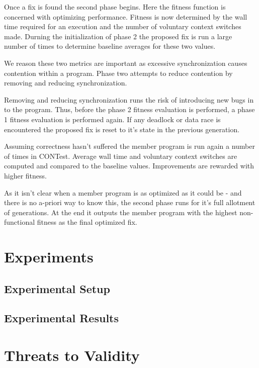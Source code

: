 \documentclass[10pt, conference, compsocconf]{IEEEtran}
\begin{document}
Once a fix is found the second phase begins.  Here the fitness function is concerned with optimizing performance.  Fitness is now determined by the wall time required for an execution and the number of voluntary context switches made.  Durning the initialization of phase 2 the proposed fix is run a large number of times to determine baseline averages for these two values.

We reason these two metrics are important as excessive synchronization causes contention within a program.  Phase two attempts to reduce contention by removing and reducing synchronization.

Removing and reducing synchronization runs the risk of introducing new bugs in to the program.  Thus, before the phase 2 fitness evaluation is performed, a phase 1 fitness evaluation is performed again.  If any deadlock or data race is encountered the proposed fix is reset to it's state in the previous generation. 

Assuming correctness hasn't suffered the member program is run again a number of times in CONTest.  Average wall time and voluntary context switches are computed and compared to the baseline values.  Improvements are rewarded with higher fitness.  

As it isn't clear when a member program is as optimized as it could be - and there is no a-priori way to know this, the second phase runs for it's full allotment of generations.  At the end it outputs the member program with the highest non-functional fitness as the final optimized fix.
 
\section{Experiments}




\subsection{Experimental Setup}




\subsection{Experimental Results}




\section{Threats to Validity}
\end{document}
